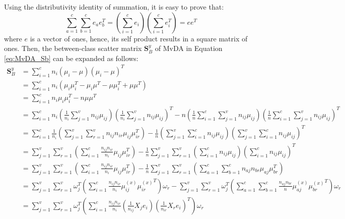 \begin{appendix}
    Using the distributivity identity of summation, it is easy to prove that:
    \begin{equation}
        \sum_{a=1}^{c}\sum_{b=1}^{c}e_a e_b^T = \left(\sum_{i=1}^{c}e_i\right)\left(\sum_{i=1}^{c}e_i^T\right) = ee^T
    \end{equation}
    where $e$ is a vector of ones, hence, its self product results in a square matrix of ones.
    Then, the between-class scatter matrix $\boldsymbol{S}^y_B$ of MvDA in Equation \eqref{eq:MvDA_Sb} can be expanded as follows:
    \begin{equation}
        \begin{split}
            \boldsymbol{S}^y_B &= \sum_{i=1}^{c}n_i\left(\mu_i - \mu\right)\left(\mu_i - \mu\right)^T \\
            &= \sum_{i=1}^{c}n_i\left(\mu_i\mu_i^T - \mu_i\mu^T - \mu\mu_i^T + \mu\mu^T\right) \\
            &= \sum_{i=1}^{c}n_i\mu_i\mu_i^T - n\mu\mu^T \\
            &= \sum_{i=1}^{c}n_i\left(\frac{1}{n_i}\sum_{j=1}^{v}n_{ij}\mu_{ij}\right)\left(\frac{1}{n_i}\sum_{j=1}^{v}n_{ij}\mu_{ij}\right)^T - n\left(\frac{1}{n}\sum_{i=1}^{c}\sum_{j=1}^{v}n_{ij}\mu_{ij}\right)\left(\frac{1}{n}\sum_{i=1}^{c}\sum_{j=1}^{v}n_{ij}\mu_{ij}\right)^T \\
            &= \sum_{i=1}^{c}\frac{1}{n_i}\left(\sum_{j=1}^{v}\sum_{r=1}^{v}n_{ij}n_{ir}\mu_{ij}\mu_{ir}^T\right) - \frac{1}{n}\left(\sum_{j=1}^{v}\sum_{i=1}^{c}n_{ij}\mu_{ij}\right)\left(\sum_{j=1}^{v}\sum_{i=1}^{c}n_{ij}\mu_{ij}\right)^T \\
            &= \sum_{j=1}^{v}\sum_{r=1}^{v}\left(\sum_{i=1}^{c}\frac{n_{ij}n_{ir}}{n_i}\mu_{ij}\mu_{ir}^T\right) - \frac{1}{n}\sum_{j=1}^{v}\sum_{r=1}^{v}\left(\sum_{i=1}^{c}n_{ij}\mu_{ij}\right)\left(\sum_{i=1}^{c}n_{ij}\mu_{ij}\right)^T \\
            &= \sum_{j=1}^{v}\sum_{r=1}^{v}\left(\sum_{i=1}^{c}\frac{n_{ij}n_{ir}}{n_i}\mu_{ij}\mu_{ir}^T\right) - \frac{1}{n}\sum_{j=1}^{v}\sum_{r=1}^{v}\left(\sum_{a=1}^{c}\sum_{b=1}^{c}n_{aj}n_{br}\mu_{aj}\mu_{br}^T\right) \\
            &= \sum_{j=1}^{v}\sum_{r=1}^{v}\omega_j^T\left(\sum_{i=1}^{c}\frac{n_{ij}n_{ir}}{n_i}\mu^{(x)}_{ij}{\mu^{(x)}_{ir}}^T\right)\omega_r - \sum_{j=1}^{v}\sum_{r=1}^{v}\omega_j^T\left(\sum_{a=1}^{c}\sum_{b=1}^{c}\frac{n_{aj}n_{br}}{n}\mu^{(x)}_{aj}{\mu^{(x)}_{br}}^T\right)\omega_r \\
            &= \sum_{j=1}^{v}\sum_{r=1}^{v}\omega_j^T\left(\sum_{i=1}^{c}\frac{n_{ij}n_{ir}}{n_i}\left(\frac{1}{n_{ij}}X_j e_i\right)\left(\frac{1}{n_{ir}}X_r e_i\right)^T\right)\omega_r \\

\end{split}
\end{equation}
\end{appendix}
